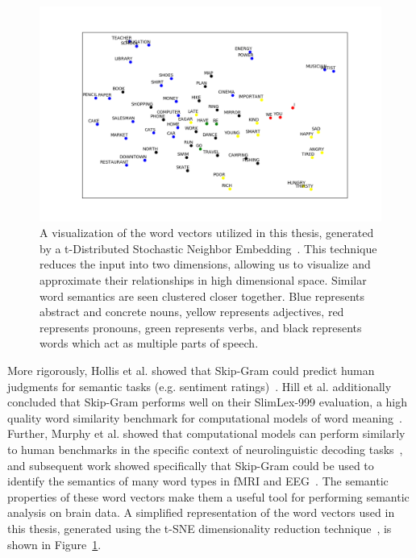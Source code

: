 \begin{figure}[t]
  \centerline{
    \includegraphics[width=\linewidth]{figures/tsne}
  }
  \caption[Visualization of Utilized Word Vectors]{
    A visualization of the word vectors utilized in this thesis, generated by a 
    t-Distributed Stochastic Neighbor Embedding~\cite{maaten2008visualizing}.  
    This technique reduces the input into two dimensions, allowing us to 
    visualize and approximate their relationships in high dimensional space.  
    Similar word semantics are seen clustered closer together. Blue represents 
    abstract and concrete nouns, yellow represents adjectives, red represents 
    pronouns, green represents verbs, and black represents words which act as 
    multiple parts of speech.
  }
  \label{fig:tsne}
\end{figure}

More rigorously, Hollis et al. showed that Skip-Gram could predict human 
judgments for semantic tasks (e.g. sentiment 
ratings)~\cite{hollis2017extrapolating}.  Hill et al.  additionally concluded 
that Skip-Gram performs well on their SlimLex-999 evaluation, a high quality 
word similarity benchmark for computational models of word 
meaning~\cite{hill2016simlex}. Further, Murphy et al. showed that computational 
models can perform similarly to human benchmarks in the specific context of 
neurolinguistic decoding tasks~\cite{Murphy2012}, and subsequent work showed 
specifically that Skip-Gram could be used to identify the semantics of many 
word types in fMRI and EEG~\cite{xu2016brainbench}. The semantic properties of 
these word vectors make them a useful tool for performing semantic analysis on 
brain data. A simplified representation of the word vectors used in this 
thesis, generated using the t-SNE dimensionality reduction 
technique~\cite{maaten2008visualizing}, is shown in Figure~\ref{fig:tsne}.

